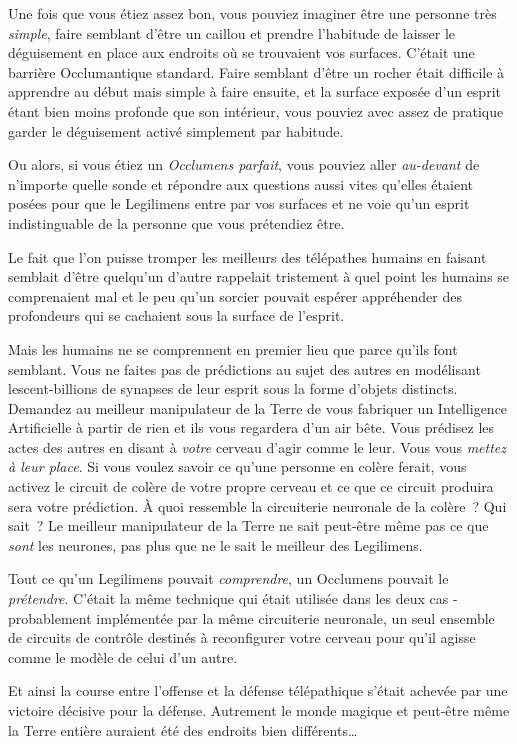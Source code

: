 Une fois que vous étiez assez bon, vous pouviez imaginer être une personne très \emph{simple}, faire semblant d'être un caillou et prendre l'habitude de laisser le déguisement en place aux endroits où se trouvaient vos surfaces. C'était une barrière Occlumantique standard. Faire semblant d'être un rocher était difficile à apprendre au début mais simple à faire ensuite, et la surface exposée d'un esprit étant bien moins profonde que son intérieur, vous pouviez avec assez de pratique garder le déguisement activé simplement par habitude.

Ou alors, si vous étiez un \emph{Occlumens parfait}, vous pouviez aller \emph{au-devant} de n'importe quelle sonde et répondre aux questions aussi vites qu'elles étaient posées pour que le Legilimens entre par vos surfaces et ne voie qu'un esprit indistinguable de la personne que vous prétendiez être.

Le fait que l'on puisse tromper les meilleurs des télépathes humains en faisant semblait d'être quelqu'un d'autre rappelait tristement à quel point les humains se comprenaient mal et le peu qu'un sorcier pouvait espérer appréhender des profondeurs qui se cachaient sous la surface de l'esprit.

Mais les humains ne se comprennent en premier lieu que parce qu'ils font semblant. Vous ne faites pas de prédictions au sujet des autres en modélisant lescent-billions de synapses de leur esprit sous la forme d'objets distincts. Demandez au meilleur manipulateur de la Terre de vous fabriquer un Intelligence Artificielle à partir de rien et ils vous regardera d'un air bête. Vous prédisez les actes des autres en disant à \emph{votre} cerveau d'agir comme le leur. Vous vous \emph{mettez à leur place}. Si vous voulez savoir ce qu'une personne en colère ferait, vous activez le circuit de colère de votre propre cerveau et ce que ce circuit produira sera votre prédiction. À quoi ressemble la circuiterie neuronale de la colère~? Qui sait~? Le meilleur manipulateur de la Terre ne sait peut-être même pas ce que \emph{sont} les neurones, pas plus que ne le sait le meilleur des Legilimens.

Tout ce qu'un Legilimens pouvait \emph{comprendre}, un Occlumens pouvait le \emph{prétendre}. C'était la même technique qui était utilisée dans les deux cas - probablement implémentée par la même circuiterie neuronale, un seul ensemble de circuits de contrôle destinés à reconfigurer votre cerveau pour qu'il agisse comme le modèle de celui d'un autre.

Et ainsi la course entre l'offense et la défense télépathique s'était achevée par une victoire décisive pour la défense. Autrement le monde magique et peut-être même la Terre entière auraient été des endroits bien différents…

